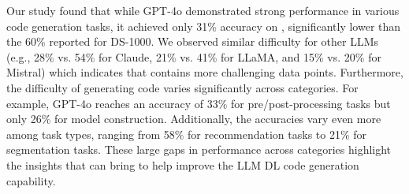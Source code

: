 
Our study found that while GPT-4o demonstrated strong performance in various code generation tasks, it achieved only 31\% accuracy on \tool, significantly lower than the 60\% reported for DS-1000. We observed similar difficulty for other LLMs (e.g., 28\% vs. 54\% for Claude, 21\% vs. 41\% for LLaMA, and 15\% vs. 20\%  for Mistral) which indicates that \tool contains more challenging data points. Furthermore, the difficulty of generating code varies significantly across categories. For example, GPT-4o reaches an accuracy of 33\% for pre/post-processing tasks but only 26\% for model construction. Additionally, the accuracies vary even more among task types, ranging from 58\% for recommendation tasks to 21\% for segmentation tasks. These large gaps in performance across categories highlight the insights that \tool can bring to help improve the LLM DL code generation capability.

